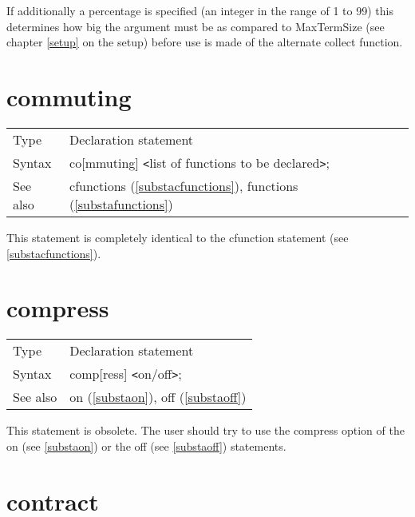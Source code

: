 \noindent If additionally a percentage is specified (an 
integer in the range of 1 to 99) this determines how big the argument must 
be as compared to MaxTermSize (see chapter \ref{setup} on the setup) before 
use is made of the alternate collect function. \vspace{10mm}

 
\section{commuting}
\label{substacommuting}

\noindent \begin{tabular}{ll}
Type & Declaration statement\\
Syntax & co[mmuting] {\tt<}list of functions to be declared{\tt>}; \\
See also & cfunctions (\ref{substacfunctions}), functions (\ref{substafunctions})
\end{tabular} \vspace{4mm}

\noindent This statement is completely identical to the 
cfunction statement (see \ref{substacfunctions}). \vspace{10mm}


\section{compress}
\label{substacompress}

\noindent \begin{tabular}{ll}
Type & Declaration statement\\
Syntax & comp[ress] {\tt<}on/off{\tt>};
\\ See also & on (\ref{substaon}), off (\ref{substaoff})
\end{tabular} \vspace{4mm}

\noindent This statement is obsolete. The user should try 
to use the compress option of the on (see \ref{substaon}) or the off (see 
\ref{substaoff}) statements. \vspace{10mm}


\section{contract}
\label{substacontract}

